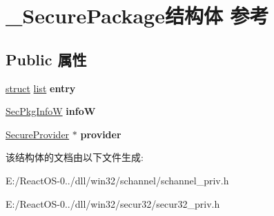 \hypertarget{struct___secure_package}{}\section{\+\_\+\+Secure\+Package结构体 参考}
\label{struct___secure_package}
\subsection*{Public 属性}
\begin{DoxyCompactItemize}
\item 
\mbox{\label{struct___secure_package_a710823dd1317041d8166215210b535c9}} 
\hyperlink{interfacestruct}{struct} \hyperlink{classlist}{list} {\bfseries entry}
\item 
\mbox{\label{struct___secure_package_a21a499686d342ec11f5f5b82850e358f}} 
\hyperlink{struct___sec_pkg_info_w}{Sec\+Pkg\+InfoW} {\bfseries infoW}
\item 
\mbox{\label{struct___secure_package_a72f6d1315ae8f36888d300728b113891}} 
\hyperlink{struct___secure_provider}{Secure\+Provider} $\ast$ {\bfseries provider}
\end{DoxyCompactItemize}


该结构体的文档由以下文件生成\+:\begin{DoxyCompactItemize}
\item 
E\+:/\+React\+O\+S-\/0../dll/win32/schannel/schannel\+\_\+priv.\+h\item 
E\+:/\+React\+O\+S-\/0../dll/win32/secur32/secur32\+\_\+priv.\+h\end{DoxyCompactItemize}
